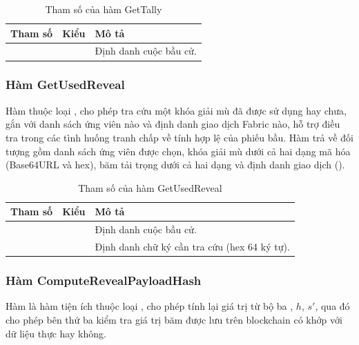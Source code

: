 \begin{table}[H]
    \centering
    \small
    \setlength{\tabcolsep}{3pt}
    \caption{Tham số của hàm GetTally}
    \label{tab:cc-gettally}
    \begin{tabularx}{\textwidth}{|L{0.25}|L{0.25}|L{0.50}|}
    \hline
    \textbf{Tham số} & \textbf{Kiểu} & \textbf{Mô tả} \\
    \hline
     &  & Định danh cuộc bầu cử. \\ \hline
    \end{tabularx}
\end{table}

\subsubsection{Hàm GetUsedReveal}

Hàm  thuộc loại , cho phép tra cứu một khóa giải mù đã được sử dụng hay chưa, gắn với danh sách ứng viên nào và định danh giao dịch Fabric nào, hỗ trợ điều tra trong các tình huống tranh chấp về tính hợp lệ của phiếu bầu. Hàm trả về đối tượng  gồm danh sách ứng viên được chọn, khóa giải mù dưới cả hai dạng mã hóa (Base64URL và hex), băm tải trọng dưới cả hai dạng và định danh giao dịch ().

\begin{table}[H]
    \centering
    \small
    \setlength{\tabcolsep}{3pt}
    \caption{Tham số của hàm GetUsedReveal}
    \label{tab:cc-getusedreveal}
    \begin{tabularx}{\textwidth}{|L{0.25}|L{0.25}|L{0.50}|}
    \hline
    \textbf{Tham số} & \textbf{Kiểu} & \textbf{Mô tả} \\
    \hline
     &  & Định danh cuộc bầu cử. \\ \hline
      &  & Định danh chữ ký cần tra cứu (hex 64 ký tự). \\ \hline
    \end{tabularx}
\end{table}

\subsubsection{Hàm ComputeRevealPayloadHash}

Hàm  là hàm tiện ích thuộc loại , cho phép tính lại giá trị  từ bộ ba , $h$, $s'$, qua đó cho phép bên thứ ba kiểm tra giá trị băm được lưu trên blockchain có khớp với dữ liệu thực hay không.

